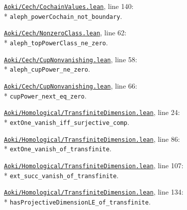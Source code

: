 \begin{leansources}
\item \href{../../../lean/Aoki/Cech/CochainValues.lean}{\nolinkurl{Aoki/Cech/CochainValues.lean}}, line 140:\\*
\nolinkurl{aleph_powerCochain_not_boundary}.
\item \href{../../../lean/Aoki/Cech/NonzeroClass.lean}{\nolinkurl{Aoki/Cech/NonzeroClass.lean}}, line 62:\\*
\nolinkurl{aleph_topPowerClass_ne_zero}.
\item \href{../../../lean/Aoki/Cech/CupNonvanishing.lean}{\nolinkurl{Aoki/Cech/CupNonvanishing.lean}}, line 58:\\*
\nolinkurl{aleph_cupPower_ne_zero}.
\item \href{../../../lean/Aoki/Cech/CupNonvanishing.lean}{\nolinkurl{Aoki/Cech/CupNonvanishing.lean}}, line 66:\\*
\nolinkurl{cupPower_next_eq_zero}.
\end{leansources}

\begin{leansources}
\item \href{../../../lean/Aoki/Homological/TransfiniteDimension.lean}{\nolinkurl{Aoki/Homological/TransfiniteDimension.lean}}, line 24:\\*
\nolinkurl{extOne_vanish_iff_surjective_comp}.
\item \href{../../../lean/Aoki/Homological/TransfiniteDimension.lean}{\nolinkurl{Aoki/Homological/TransfiniteDimension.lean}}, line 86:\\*
\nolinkurl{extOne_vanish_of_transfinite}.
\item \href{../../../lean/Aoki/Homological/TransfiniteDimension.lean}{\nolinkurl{Aoki/Homological/TransfiniteDimension.lean}}, line 107:\\*
\nolinkurl{ext_succ_vanish_of_transfinite}.
\item \href{../../../lean/Aoki/Homological/TransfiniteDimension.lean}{\nolinkurl{Aoki/Homological/TransfiniteDimension.lean}}, line 134:\\*
\nolinkurl{hasProjectiveDimensionLE_of_transfinite}.
\end{leansources}

